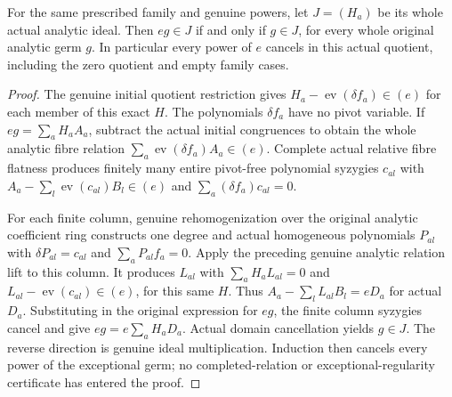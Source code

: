 \begin{theorem}
\label{hir:actual-relative-normalized-family-exceptional-regular}
\leanok
For the same prescribed family and genuine powers, let $J=(H_a)$ be its whole
actual analytic ideal. Then $eg\in J$ if and only if $g\in J$, for every
whole original analytic germ $g$. In particular every power of $e$ cancels
in this actual quotient, including the zero quotient and empty family cases.
\end{theorem}
\begin{proof}
The genuine initial quotient restriction gives
$H_a-\operatorname{ev}(\delta f_a)\in(e)$ for each member of this exact $H$.
The polynomials $\delta f_a$ have no pivot variable. If
$eg=\sum_aH_aA_a$, subtract the actual initial congruences to obtain the
whole analytic fibre relation $\sum_a\operatorname{ev}(\delta f_a)A_a\in(e)$.
Complete actual relative fibre flatness produces finitely many entire
pivot-free polynomial syzygies $c_{al}$ with
$A_a-\sum_l\operatorname{ev}(c_{al})B_l\in(e)$ and
$\sum_a(\delta f_a)c_{al}=0$.

For each finite column, genuine rehomogenization over the original analytic
coefficient ring constructs one degree and actual homogeneous polynomials
$P_{al}$ with $\delta P_{al}=c_{al}$ and $\sum_aP_{al}f_a=0$.
Apply the preceding genuine analytic relation lift to this column. It produces
$L_{al}$ with $\sum_aH_aL_{al}=0$ and
$L_{al}-\operatorname{ev}(c_{al})\in(e)$, for this same $H$.
Thus $A_a-\sum_lL_{al}B_l=eD_a$ for actual $D_a$.
Substituting in the original expression for $eg$, the finite column syzygies
cancel and give $eg=e\sum_aH_aD_a$. Actual domain cancellation yields
$g\in J$. The reverse direction is genuine ideal multiplication. Induction
then cancels every power of the exceptional germ; no completed-relation or
exceptional-regularity certificate has entered the proof.
\end{proof}

